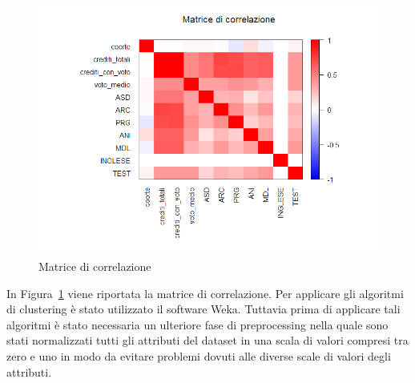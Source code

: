 \documentclass[12pt]{article}
\begin{document}
\begin{figure}[H]
	\includegraphics[width=\textwidth]{img/corMatrix.png}
	\caption{Matrice di correlazione}
	\label{fig:cMatrix}
\end{figure}

In Figura~\ref{fig:cMatrix} viene riportata la matrice di correlazione.
Per applicare gli algoritmi di clustering è stato utilizzato il software Weka. Tuttavia prima di applicare tali algoritmi è stato necessaria un ulteriore fase di preprocessing
nella quale sono stati normalizzati tutti gli attributi del data\-set in una scala di valori compresi tra zero e uno in modo da evitare problemi dovuti alle diverse scale di valori degli attributi.

\newpage
\end{document}
